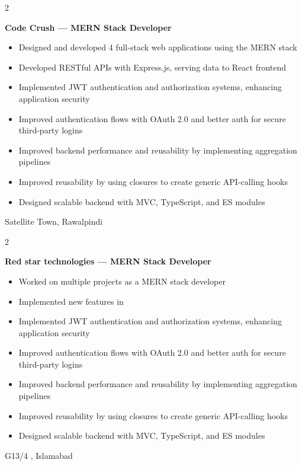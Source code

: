 \documentclass[10pt, letterpaper]{article}
\newenvironment{highlights}{
    \begin{itemize}[
        topsep=0.10 cm,
        parsep=0.10 cm,
        partopsep=0pt,
        itemsep=0pt,
        leftmargin=0.4 cm + 10pt
    ]
}{
    \end{itemize}
}
\newenvironment{twocolentry}[2][]{
    \onecolentry
    \def\secondColumn{#2}
    \setcolumnwidth{\fill, 4.5 cm}
    \begin{paracol}{2}
}{
    \switchcolumn \raggedleft \secondColumn
    \end{paracol}
    \endonecolentry
}
\begin{document}
\begin{twocolentry}{
		Satellite Town, Rawalpindi\\
	}
	\textbf{Code Crush — MERN Stack Developer}
	\begin{highlights}
		\item Designed and developed 4 full-stack web applications using the MERN stack
		\item Developed RESTful APIs with Express.js, serving data to React frontend
		\item Implemented JWT authentication and authorization systems, enhancing application security
		\item Improved authentication flows with OAuth 2.0 and better auth for secure third-party logins
		\item Improved backend performance and reusability by implementing aggregation pipelines
		\item Improved reusability by using closures to create generic API-calling hooks
		\item Designed scalable backend with MVC, TypeScript, and ES modules
	\end{highlights}
\end{twocolentry}
\begin{twocolentry}{
		G13/4 , Islamabad\\
	}
	\textbf{Red star technologies — MERN Stack Developer}
	\begin{highlights}
		\item Worked on multiple projects as a MERN stack developer 
		\item Implemented new features in 
		\item Implemented JWT authentication and authorization systems, enhancing application security
		\item Improved authentication flows with OAuth 2.0 and better auth for secure third-party logins
		\item Improved backend performance and reusability by implementing aggregation pipelines
		\item Improved reusability by using closures to create generic API-calling hooks
		\item Designed scalable backend with MVC, TypeScript, and ES modules
	\end{highlights}
\end{twocolentry}
\end{document}
